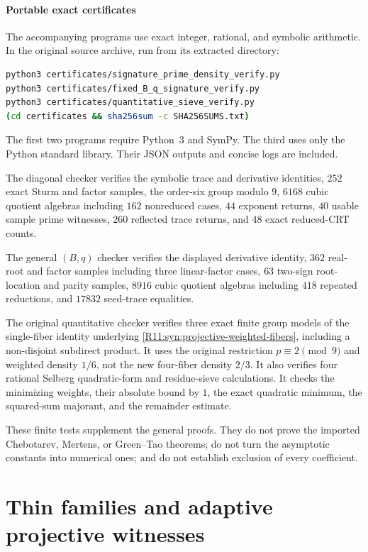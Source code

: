 \documentclass[11pt,a4paper]{article}
\theoremstyle{definition}\newtheorem{definition}[theorem]{Definition}
\theoremstyle{remark}\newtheorem{remark}[theorem]{Remark}
\begin{document}
\subsection{Portable exact certificates}

The accompanying programs use exact integer, rational, and symbolic
arithmetic. In the original source archive, run from its extracted directory:
\begin{lstlisting}[language=bash]
python3 certificates/signature_prime_density_verify.py
python3 certificates/fixed_B_q_signature_verify.py
python3 certificates/quantitative_sieve_verify.py
(cd certificates && sha256sum -c SHA256SUMS.txt)
\end{lstlisting}
The first two programs require Python~3 and SymPy.
The third uses only the Python standard library.
Their JSON outputs and concise logs are included.

The diagonal checker verifies the symbolic trace and derivative
identities, $252$ exact Sturm and factor samples, the order-six
group modulo $9$, $6168$ cubic quotient algebras including $162$
nonreduced cases, $44$ exponent returns, $40$ usable sample
prime witnesses, $260$ reflected trace returns, and $48$
exact reduced-CRT counts.

The general $(B,q)$ checker verifies the displayed derivative identity,
$362$ real-root and factor samples including three linear-factor
cases, $63$ two-sign root-location and parity samples,
$8916$ cubic quotient algebras including $418$ repeated reductions,
and $17832$ seed-trace equalities.

The original quantitative checker verifies three exact finite group models
of the single-fiber identity underlying \eqref{R11:syn:projective-weighted-fibers}, including a non-disjoint subdirect product. It uses the original
restriction $p\equiv2\pmod9$ and weighted density $1/6$, not the new
four-fiber density $2/3$. It also verifies
four rational Selberg quadratic-form and residue-sieve calculations.
It checks the minimizing weights, their absolute bound by $1$,
the exact quadratic minimum, the squared-sum majorant,
and the remainder estimate.

These finite tests supplement the general proofs.
They do not prove the imported Chebotarev, Mertens, or Green--Tao
theorems; do not turn the asymptotic constants into numerical ones;
and do not establish exclusion of every coefficient.



\endgroup

\clearpage\part{Thin families and adaptive projective witnesses}
\end{document}
